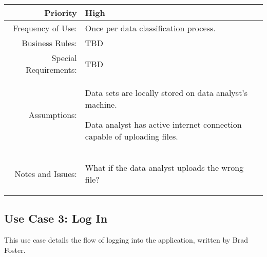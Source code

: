 \documentclass[12pt,oneside,letterpaper]{article}
\newenvironment{packed_enumerate}{ %
\vspace{-7mm}
\begin{enumerate}
  \setlength{\itemsep}{0pt}
  \setlength{\parskip}{0pt}
  \setlength{\parsep}{0pt}
}{\end{enumerate}
\vspace{-8mm}}
\begin{document}
\begin{longtable}{|r|p{3.8in}|}
\hline
Priority&High\\
\hline
Frequency of Use:&Once per data classification process.\\
\hline
Business Rules:&TBD\\
\hline
Special Requirements:&TBD\\
\hline
Assumptions:&\begin{packed_enumerate}
\item Data sets are locally stored on data analyst's machine.
\item Data analyst has active internet connection capable of uploading files.
\end{packed_enumerate}\\
\hline
Notes and Issues:&\begin{packed_enumerate}
\item What if the data analyst uploads the wrong file?
\end{packed_enumerate}\\
\hline
\end{longtable}

\subsection{\label{Log In}Use Case 3: Log In}
This use case details the flow of logging into the application, written by Brad Foster.
\end{document}
